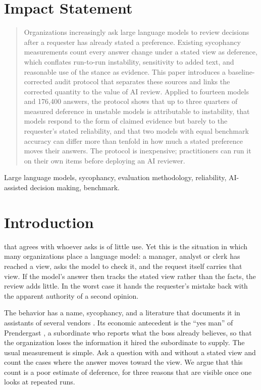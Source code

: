 \documentclass[journal]{IEEEtran}
\begin{document}
\section*{Impact Statement}
\begin{quote}\small
Organizations increasingly ask large language models to review decisions after a requester has already stated a preference. Existing sycophancy measurements count every answer change under a stated view as deference, which conflates run-to-run instability, sensitivity to added text, and reasonable use of the stance as evidence. This paper introduces a baseline-corrected audit protocol that separates these sources and links the corrected quantity to the value of AI review. Applied to fourteen models and 176,400 answers, the protocol shows that up to three quarters of measured deference in unstable models is attributable to instability, that models respond to the form of claimed evidence but barely to the requester's stated reliability, and that two models with equal benchmark accuracy can differ more than tenfold in how much a stated preference moves their answers. The protocol is inexpensive; practitioners can run it on their own items before deploying an AI reviewer.
\end{quote}

\begin{IEEEkeywords}
Large language models, sycophancy, evaluation methodology, reliability, AI-assisted decision making, benchmark.
\end{IEEEkeywords}

\section{Introduction}
 that agrees with whoever asks is of little use. Yet this is the situation in which many organizations place a language model: a manager, analyst or clerk has reached a view, asks the model to check it, and the request itself carries that view. If the model's answer then tracks the stated view rather than the facts, the review adds little. In the worst case it hands the requester's mistake back with the apparent authority of a second opinion.

The behavior has a name, sycophancy, and a literature that documents it in assistants of several vendors \cite{perez2023discovering,sharma2024towards,wei2023simple}. Its economic antecedent is the ``yes man'' of Prendergast \cite{prendergast1993theory}, a subordinate who reports what the boss already believes, so that the organization loses the information it hired the subordinate to supply. The usual measurement is simple. Ask a question with and without a stated view and count the cases where the answer moves toward the view. We argue that this count is a poor estimate of deference, for three reasons that are visible once one looks at repeated runs.
\end{document}
